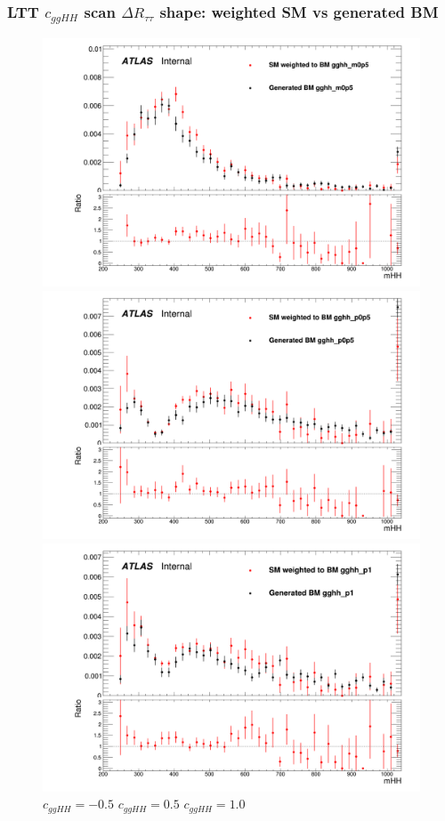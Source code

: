 \documentclass[twoside,11pt]{beamer}
\begin{document}
\begin{frame}
\frametitle{LTT $c_{ggHH}$ scan $\Delta R_{\tau\tau}$ shape: weighted SM vs generated BM}

\begin{figure}
\includegraphics[width=.32\textwidth]{figures/Method_B_all_latest_LTT/BMgghh_m0p5h_mHH.png}
\includegraphics[width=.32\textwidth]{figures/Method_B_all_latest_LTT/BMgghh_p0p5h_mHH.png}
\includegraphics[width=.32\textwidth]{figures/Method_B_all_latest_LTT/BMgghh_p1h_mHH.png}
$c_{ggHH} = -0.5$ \hspace{5em} $c_{ggHH} = 0.5$\hspace{5em} $c_{ggHH} = 1.0$
\end{figure}


\end{frame}     
\end{document}
